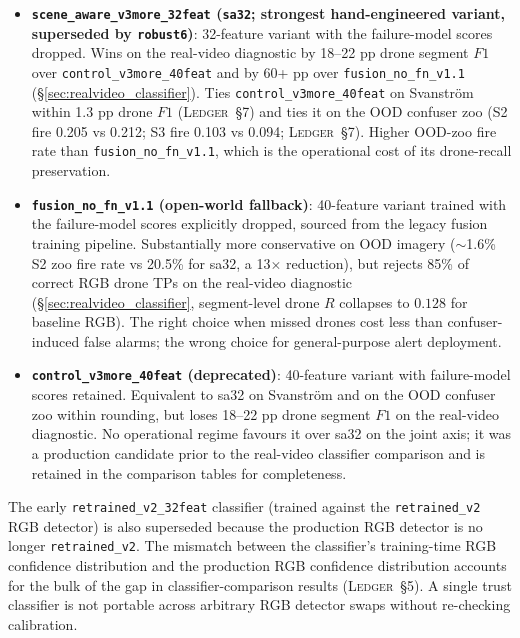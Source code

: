 \documentclass[12pt,a4paper,oneside,openright]{book}
\begin{document}
\begin{itemize}
    \item \textbf{\texttt{scene\_aware\_v3more\_32feat} (\texttt{sa32}; strongest hand-engineered variant, superseded by \texttt{robust6})}: 32-feature variant with the failure-model scores dropped. Wins on the real-video diagnostic by 18--22 pp drone segment $F1$ over \texttt{control\_v3more\_40feat} and by 60+ pp over \texttt{fusion\_no\_fn\_v1.1} (\S\ref{sec:realvideo_classifier}). Ties \texttt{control\_v3more\_40feat} on Svanstr\"om within 1.3 pp drone $F1$ (\textsc{Ledger}~\S7) and ties it on the OOD confuser zoo (S2 fire 0.205 vs 0.212; S3 fire 0.103 vs 0.094; \textsc{Ledger}~\S7). Higher OOD-zoo fire rate than \texttt{fusion\_no\_fn\_v1.1}, which is the operational cost of its drone-recall preservation.
    \item \textbf{\texttt{fusion\_no\_fn\_v1.1} (open-world fallback)}: 40-feature variant trained with the failure-model scores explicitly dropped, sourced from the legacy fusion training pipeline. Substantially more conservative on OOD imagery ($\sim$1.6\% S2 zoo fire rate vs 20.5\% for sa32, a 13$\times$ reduction), but rejects 85\% of correct RGB drone TPs on the real-video diagnostic (\S\ref{sec:realvideo_classifier}, segment-level drone $R$ collapses to $0.128$ for baseline RGB). The right choice when missed drones cost less than confuser-induced false alarms; the wrong choice for general-purpose alert deployment.
    \item \textbf{\texttt{control\_v3more\_40feat} (deprecated)}: 40-feature variant with failure-model scores retained. Equivalent to sa32 on Svanstr\"om and on the OOD confuser zoo within rounding, but loses 18--22 pp drone segment $F1$ on the real-video diagnostic. No operational regime favours it over sa32 on the joint axis; it was a production candidate prior to the real-video classifier comparison and is retained in the comparison tables for completeness.
\end{itemize}

The early \texttt{retrained\_v2\_32feat} classifier (trained against the \texttt{retrained\_v2} RGB detector) is also superseded because the production RGB detector is no longer \texttt{retrained\_v2}. The mismatch between the classifier's training-time RGB confidence distribution and the production RGB confidence distribution accounts for the bulk of the gap in classifier-comparison results (\textsc{Ledger}~\S5). A single trust classifier is not portable across arbitrary RGB detector swaps without re-checking calibration.
\end{document}
